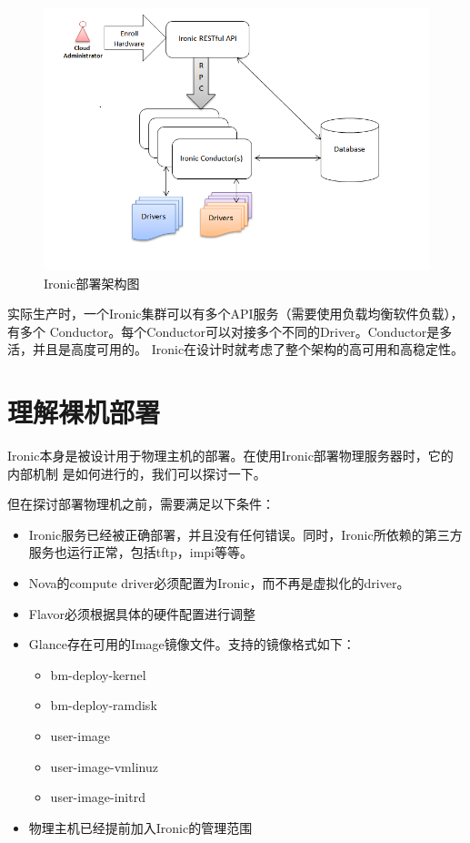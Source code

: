 \begin{figure}[H]
  \centering
  \includegraphics[scale=0.8]{deployment_architecture.png}
  \caption{Ironic部署架构图\protect\footnotemark}
  \label{fig:deployment_architecture}
\end{figure}

实际生产时，一个Ironic集群可以有多个API服务（需要使用负载均衡软件负载），有多个
Conductor。每个Conductor可以对接多个不同的Driver。Conductor是多活，并且是高度可用的。
Ironic在设计时就考虑了整个架构的高可用和高稳定性。

\section{理解裸机部署}
Ironic本身是被设计用于物理主机的部署。在使用Ironic部署物理服务器时，它的内部机制
是如何进行的，我们可以探讨一下。
\par 但在探讨部署物理机之前，需要满足以下条件：
\begin{itemize}
  \item Ironic服务已经被正确部署，并且没有任何错误。同时，Ironic所依赖的第三方服务也运行正常，包括tftp，impi等等。
  \item Nova的compute driver必须配置为Ironic，而不再是虚拟化的driver。
  \item Flavor必须根据具体的硬件配置进行调整
  \item Glance存在可用的Image镜像文件。支持的镜像格式如下：
  \begin{itemize}
    \item bm-deploy-kernel
    \item bm-deploy-ramdisk
    \item user-image
    \item user-image-vmlinuz
    \item user-image-initrd
  \end{itemize}
  \item 物理主机已经提前加入Ironic的管理范围
\end{itemize}

